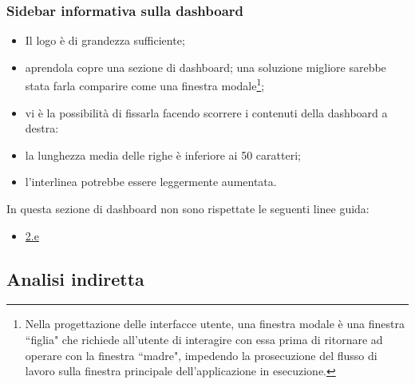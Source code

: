 \subsubsection{Sidebar informativa sulla dashboard}
\label{sss:sidebar-informativa-dashboard}
\begin{itemize}
    \item Il logo è di grandezza sufficiente;
    \item aprendola copre una sezione di dashboard; una soluzione migliore sarebbe stata farla comparire come una finestra modale\footnote{Nella progettazione delle interfacce utente, una finestra modale è una finestra ``figlia" che richiede all'utente di interagire con essa prima di ritornare ad operare con la finestra ``madre", impedendo la prosecuzione del flusso di lavoro sulla finestra principale dell'applicazione in esecuzione.};
    \item vi è la possibilità di fissarla facendo scorrere i contenuti della dashboard a destra:
    \item la lunghezza media delle righe è inferiore ai 50 caratteri;
    \item l'interlinea potrebbe essere leggermente aumentata.
\end{itemize}
In questa sezione di dashboard non sono rispettate le seguenti linee guida:
\begin{itemize}
    \item \hyperref[lg:2.e]{2.e}
\end{itemize}

\subsection{Analisi indiretta}
\label{ss:analisi-indiretta}
